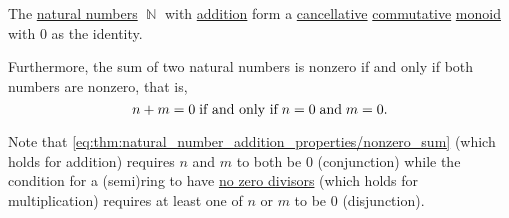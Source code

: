 \begin{proposition}\label{thm:natural_number_addition_properties}
  The \hyperref[def:set_of_natural_numbers]{natural numbers} \( \BbbN \) with \hyperref[def:peano_arithmetic/plus]{addition} form a \hyperref[def:magma/cancellative]{cancellative} \hyperref[def:magma/commutative]{commutative} \hyperref[def:unital_magma/associative]{monoid} with \( 0 \) as the identity.

  Furthermore, the sum of two natural numbers is nonzero if and only if both numbers are nonzero, that is,
  \begin{equation}\label{eq:thm:natural_number_addition_properties/nonzero_sum}
    n + m = 0 \T{if and only if} n = 0 \T{and} m = 0.
  \end{equation}

  Note that \eqref{eq:thm:natural_number_addition_properties/nonzero_sum} (which holds for addition) requires \( n \) and \( m \) to both be \( 0 \) (conjunction) while the condition for a (semi)ring to have \hyperref[def:semiring/no_zero_divisor]{no zero divisors} (which holds for multiplication) requires at least one of \( n \) or \( m \) to be \( 0 \) (disjunction).
\end{proposition}
